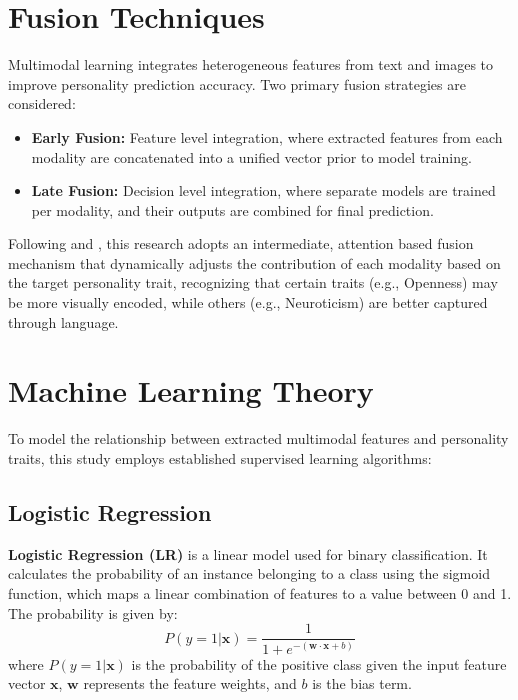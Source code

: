 \section{Fusion Techniques}

Multimodal learning integrates heterogeneous features from text and images to improve personality prediction accuracy. Two primary fusion strategies are considered:

\begin{itemize}
	\item \textbf{Early Fusion:} Feature level integration, where extracted features from each modality are concatenated into a unified vector prior to model training.
	\item \textbf{Late Fusion:} Decision level integration, where separate models are trained per modality, and their outputs are combined for final prediction.
\end{itemize}

Following \citet{liu2022} and \citet{kampman2018}, this research adopts an intermediate, attention based fusion mechanism that dynamically adjusts the contribution of each modality based on the target personality trait, recognizing that certain traits (e.g., Openness) may be more visually encoded, while others (e.g., Neuroticism) are better captured through language.

\section{Machine Learning Theory}

To model the relationship between extracted multimodal features and personality traits, this study employs established supervised learning algorithms:

\subsection{Logistic Regression}
\textbf{Logistic Regression (LR)} is a linear model used for binary classification. It calculates the probability of an instance belonging to a class using the sigmoid function, which maps a linear combination of features to a value between 0 and 1. The probability is given by:
$$P(y=1 | \mathbf{x}) = \frac{1}{1 + e^{-(\mathbf{w} \cdot \mathbf{x} + b)}}$$
where $P(y=1|\mathbf{x})$ is the probability of the positive class given the input feature vector $\mathbf{x}$, $\mathbf{w}$ represents the feature weights, and $b$ is the bias term.


